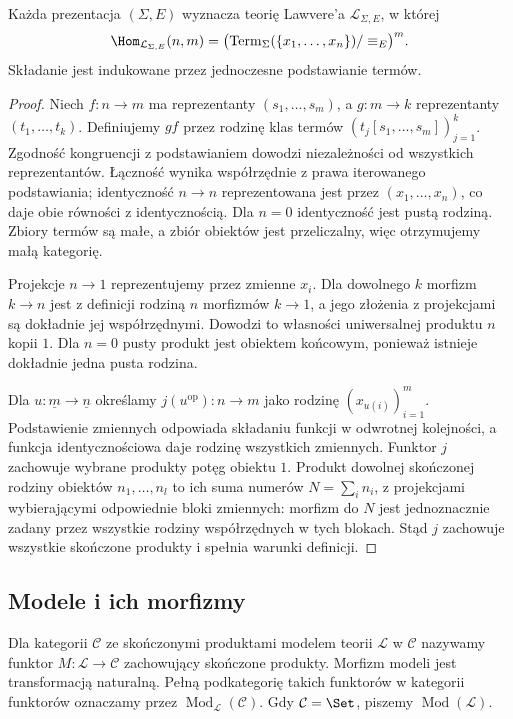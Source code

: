 \begin{twierdzenie}\label{cat:thm:lawvere-term-category}
Każda prezentacja $(\Sigma,E)$ wyznacza teorię Lawvere'a $\mathcal L_{\Sigma,E}$, w której
\[
 \Hom_{\mathcal L_{\Sigma,E}}(n,m)
 =\bigl(\operatorname{Term}_\Sigma(\{x_1,\ldots,x_n\})/\equiv_E\bigr)^m.
\]
Składanie jest indukowane przez jednoczesne podstawianie termów.
\end{twierdzenie}
\begin{proof}
Niech $f:n\to m$ ma reprezentanty $(s_1,\ldots,s_m)$, a $g:m\to k$ reprezentanty $(t_1,\ldots,t_k)$. Definiujemy $gf$ przez rodzinę klas termów $(t_j[s_1,\ldots,s_m])_{j=1}^k$. Zgodność kongruencji z podstawianiem dowodzi niezależności od wszystkich reprezentantów. Łączność wynika współrzędnie z prawa iterowanego podstawiania; identyczność $n\to n$ reprezentowana jest przez $(x_1,\ldots,x_n)$, co daje obie równości z identycznością. Dla $n=0$ identyczność jest pustą rodziną. Zbiory termów są małe, a zbiór obiektów jest przeliczalny, więc otrzymujemy małą kategorię.

Projekcje $n\to1$ reprezentujemy przez zmienne $x_i$. Dla dowolnego $k$ morfizm $k\to n$ jest z definicji rodziną $n$ morfizmów $k\to1$, a jego złożenia z projekcjami są dokładnie jej współrzędnymi. Dowodzi to własności uniwersalnej produktu $n$ kopii $1$. Dla $n=0$ pusty produkt jest obiektem końcowym, ponieważ istnieje dokładnie jedna pusta rodzina.

Dla $u:\underline m\to\underline n$ określamy $j(u^{\mathrm{op}}):n\to m$ jako rodzinę $(x_{u(i)})_{i=1}^m$. Podstawienie zmiennych odpowiada składaniu funkcji w odwrotnej kolejności, a funkcja identycznościowa daje rodzinę wszystkich zmiennych. Funktor $j$ zachowuje wybrane produkty potęg obiektu $1$. Produkt dowolnej skończonej rodziny obiektów $n_1,\ldots,n_l$ to ich suma numerów $N=\sum_i n_i$, z projekcjami wybierającymi odpowiednie bloki zmiennych: morfizm do $N$ jest jednoznacznie zadany przez wszystkie rodziny współrzędnych w tych blokach. Stąd $j$ zachowuje wszystkie skończone produkty i spełnia warunki definicji.
\end{proof}

\subsection{Modele i ich morfizmy}

\begin{definicja}\label{cat:def:lawvere-model}
Dla kategorii $\mathcal C$ ze skończonymi produktami modelem teorii $\mathcal L$ w $\mathcal C$ nazywamy funktor $M:\mathcal L\to\mathcal C$ zachowujący skończone produkty. Morfizm modeli jest transformacją naturalną. Pełną podkategorię takich funktorów w kategorii funktorów oznaczamy przez $\operatorname{Mod}_{\mathcal L}(\mathcal C)$. Gdy $\mathcal C=\Set$, piszemy $\operatorname{Mod}(\mathcal L)$.
\end{definicja}

